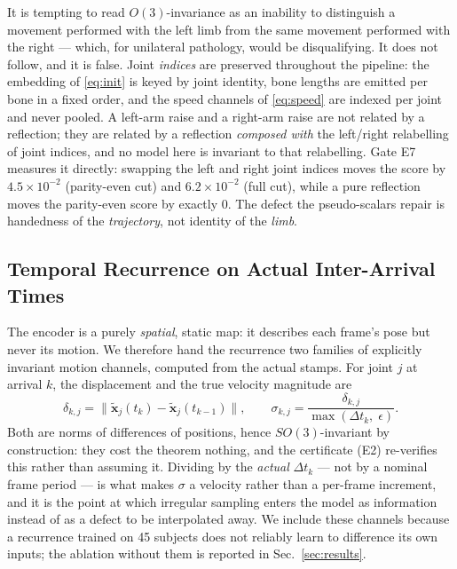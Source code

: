 \begin{remark}
\label{rem:laterality}
It is tempting to read $O(3)$-invariance as an inability to distinguish a movement performed with the
left limb from the same movement performed with the right --- which, for unilateral pathology, would be
disqualifying. It does not follow, and it is false. Joint \emph{indices} are preserved throughout the
pipeline: the embedding of \eqref{eq:init} is keyed by joint identity, bone lengths are emitted per
bone in a fixed order, and the speed channels of \eqref{eq:speed} are indexed per joint and never
pooled. A left-arm raise and a right-arm raise are not related by a reflection; they are related by a
reflection \emph{composed with} the left/right relabelling of joint indices, and no model here is
invariant to that relabelling. Gate E7 measures it directly: swapping the left and right joint indices
moves the score by $4.5\times10^{-2}$ (parity-even cut) and $6.2\times10^{-2}$ (full cut), while a pure
reflection moves the parity-even score by exactly $0$. The defect the pseudo-scalars repair is
handedness of the \emph{trajectory}, not identity of the \emph{limb}.
\end{remark}

\subsection{Temporal Recurrence on Actual Inter-Arrival Times}
\label{sec:method:recurrence}

The encoder is a purely \emph{spatial}, static map: it describes each frame's pose but never its
motion. We therefore hand the recurrence two families of explicitly invariant motion channels,
computed from the actual stamps. For joint $j$ at arrival $k$, the displacement and the true velocity
magnitude are
%
\begin{equation}
\label{eq:speed}
\delta_{k,j}=\big\|\tilde{\bm{x}}_j(t_k)-\tilde{\bm{x}}_j(t_{k-1})\big\|,
\qquad
\sigma_{k,j}=\frac{\delta_{k,j}}{\max(\Delta t_k,\;\epsilon)} .
\end{equation}
%
Both are norms of differences of positions, hence $SO(3)$-invariant by construction: they cost the
theorem nothing, and the certificate (E2) re-verifies this rather than assuming it. Dividing by the
\emph{actual} $\Delta t_k$ --- not by a nominal frame period --- is what makes $\sigma$ a
velocity rather than a per-frame increment, and it is the point at which irregular sampling enters
the model as information instead of as a defect to be interpolated away. We include these channels
because a recurrence trained on 45 subjects does not reliably learn to difference its own inputs; the
ablation without them is reported in Sec.~\ref{sec:results}.

